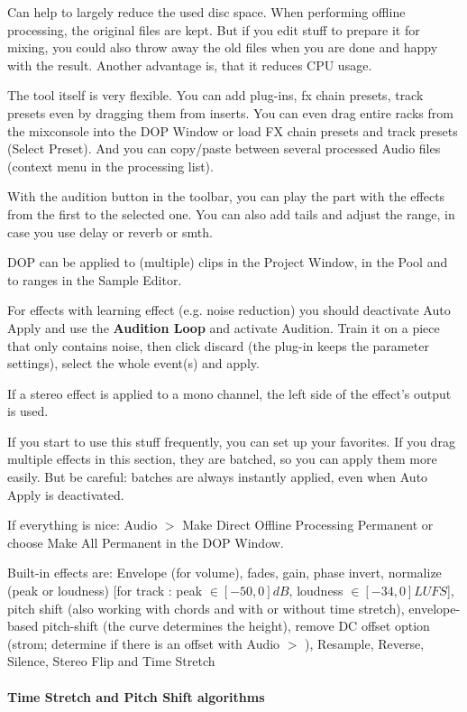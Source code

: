\documentclass[10pt]{article}
\begin{document}
Can help to largely reduce the used disc space. When performing offline processing, the original files are kept. But if you edit stuff to prepare it for mixing, you could also throw away the old files when you are done and happy with the result. Another advantage is, that it reduces CPU usage.

The tool itself is very flexible. You can add plug-ins, fx chain presets, track presets even by dragging them from inserts. You can even drag entire racks from the mixconsole into the DOP Window or load FX chain presets and track presets (Select Preset). And you can copy/paste between several processed Audio files (context menu in the processing list).

With the audition button in the toolbar, you can play the part with the effects from the first to the selected one. You can also add tails and adjust the range, in case you use delay or reverb or smth.

DOP can be applied to (multiple) clips in the Project Window, in the Pool and to ranges in the Sample Editor.

For effects with learning effect (e.g. noise reduction) you should deactivate Auto Apply and use the \textbf{Audition Loop} and activate Audition. Train it on a piece that only contains noise, then click discard (the plug-in keeps the parameter settings), select the whole event(s) and apply.

If a stereo effect is applied to a mono channel, the left side of the effect's output is used.

If you start to use this stuff frequently, you can set up your favorites. If you drag multiple effects in this section, they are batched, so you can apply them more easily. But be careful: batches are always instantly applied, even when Auto Apply is deactivated.

If everything is nice: Audio $>$ Make Direct Offline Processing Permanent or choose Make All Permanent in the DOP Window.

Built-in effects are: Envelope (for volume), fades, gain, phase invert, normalize (peak or loudness) [for track : peak $\in [-50, 0] dB$, loudness $\in [-34, 0] LUFS$], pitch shift (also working with chords and with or without time stretch), envelope-based pitch-shift (the curve determines the height), remove DC offset option (strom; determine if there is an offset with Audio $>$ ), Resample, Reverse, Silence, Stereo Flip and Time Stretch

\paragraph{Time Stretch and Pitch Shift algorithms}
\end{document}

